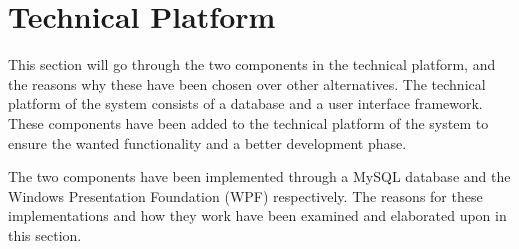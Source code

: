 \section{Technical Platform} \label{sc:tech_intro}
This section will go through the two components in the technical platform, and the reasons why these have been chosen over other alternatives. The technical platform of the system consists of a database and a user interface framework. These components have been added to the technical platform of the system to ensure the wanted functionality and a better development phase.
\par
The two components have been implemented through a MySQL database and the Windows Presentation Foundation (WPF) respectively. The reasons for these implementations and how they work have been examined and elaborated upon in this section.